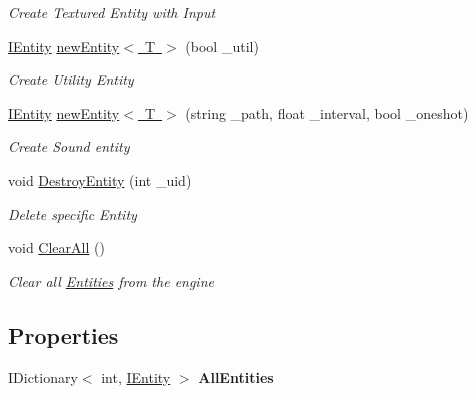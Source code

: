 \begin{DoxyCompactItemize}
\begin{DoxyCompactList}\small\item\em Create Textured Entity with Input \end{DoxyCompactList}\item 
\mbox{\hyperlink{interface_g_m_t_b_1_1_interfaces_1_1_i_entity}{I\+Entity}} \mbox{\hyperlink{class_g_m_t_b_1_1_managers_1_1_entity___manager_af5d50cb66d7a19322eb28029218d8cc9}{new\+Entity$<$ T $>$}} (bool \+\_\+util)
\begin{DoxyCompactList}\small\item\em Create Utility Entity \end{DoxyCompactList}\item 
\mbox{\hyperlink{interface_g_m_t_b_1_1_interfaces_1_1_i_entity}{I\+Entity}} \mbox{\hyperlink{class_g_m_t_b_1_1_managers_1_1_entity___manager_a20f8a9eedc3a9d9295b037d9a477cd98}{new\+Entity$<$ T $>$}} (string \+\_\+path, float \+\_\+interval, bool \+\_\+oneshot)
\begin{DoxyCompactList}\small\item\em Create Sound entity \end{DoxyCompactList}\item 
void \mbox{\hyperlink{class_g_m_t_b_1_1_managers_1_1_entity___manager_ab8b0bb504faeca844a504b33b08a31ee}{Destroy\+Entity}} (int \+\_\+uid)
\begin{DoxyCompactList}\small\item\em Delete specific Entity \end{DoxyCompactList}\item 
void \mbox{\hyperlink{class_g_m_t_b_1_1_managers_1_1_entity___manager_a9175e841b277d7773d4ee40f71b3a3fd}{Clear\+All}} ()
\begin{DoxyCompactList}\small\item\em Clear all \mbox{\hyperlink{namespace_g_m_t_b_1_1_entities}{Entities}} from the engine \end{DoxyCompactList}\end{DoxyCompactItemize}
\subsection*{Properties}
\begin{DoxyCompactItemize}
\item 
\mbox{\label{class_g_m_t_b_1_1_managers_1_1_entity___manager_a7139bcd7e0e13d529532efa665dfec05}} 
I\+Dictionary$<$ int, \mbox{\hyperlink{interface_g_m_t_b_1_1_interfaces_1_1_i_entity}{I\+Entity}} $>$ {\bfseries All\+Entities}
\end{DoxyCompactItemize}


